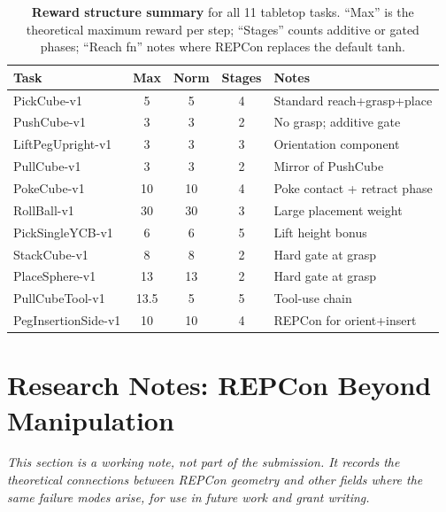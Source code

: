 \documentclass{article}
\begin{document}
\begin{table}[h]
\centering
\caption{\textbf{Reward structure summary} for all 11 tabletop tasks. ``Max'' is the
theoretical maximum reward per step; ``Stages'' counts additive or gated phases;
``Reach fn'' notes where REPCon replaces the default tanh.}
\label{tab:reward_summary}
\small
\begin{tabular}{lcccl}
\toprule
\textbf{Task} & \textbf{Max} & \textbf{Norm} & \textbf{Stages} & \textbf{Notes} \\
\midrule
PickCube-v1          & 5  & 5  & 4 & Standard reach+grasp+place \\
PushCube-v1          & 3  & 3  & 2 & No grasp; additive gate \\
LiftPegUpright-v1    & 3  & 3  & 3 & Orientation component \\
PullCube-v1          & 3  & 3  & 2 & Mirror of PushCube \\
PokeCube-v1          & 10 & 10 & 4 & Poke contact + retract phase \\
RollBall-v1          & 30 & 30 & 3 & Large placement weight \\
PickSingleYCB-v1     & 6  & 6  & 5 & Lift height bonus \\
\midrule
StackCube-v1         & 8  & 8  & 2 & Hard gate at grasp \\
PlaceSphere-v1       & 13 & 13 & 2 & Hard gate at grasp \\
PullCubeTool-v1      & 13.5 & 5 & 5 & Tool-use chain \\
PegInsertionSide-v1  & 10 & 10 & 4 & REPCon for orient+insert \\
\bottomrule
\end{tabular}
\end{table}

\section{Research Notes: REPCon Beyond Manipulation}
\label{app:beyond}

\emph{This section is a working note, not part of the submission. It records the
theoretical connections between REPCon geometry and other fields where the same
failure modes arise, for use in future work and grant writing.}
\end{document}

